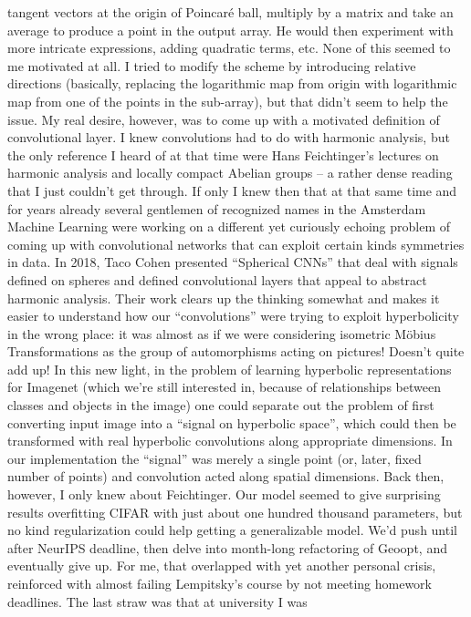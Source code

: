 tangent vectors at the origin of Poincar\'e ball, multiply by a matrix and take
an average to produce a point in the output array. He would then experiment
with more intricate expressions, adding quadratic terms, etc. None of this seemed
to me motivated at all. I tried to modify the scheme by introducing relative
directions (basically, replacing the logarithmic map from origin with
logarithmic map from one of the points in the sub-array), but that didn't seem
to help the issue. My real desire, however, was to come up with a motivated
definition of convolutional layer. I knew convolutions had to do with harmonic analysis,
but the only reference I heard of at that time were Hans Feichtinger's lectures
on harmonic analysis and locally compact Abelian groups -- a rather dense
reading that I just couldn't get through. If only I knew then that at that same
time and for years already several gentlemen of recognized names in the
Amsterdam Machine Learning were working on a different yet curiously echoing
problem of coming up with convolutional networks that can exploit certain kinds
symmetries in data. In 2018, Taco Cohen presented ``Spherical CNNs'' that deal
with signals defined on spheres and defined convolutional layers that appeal to
abstract harmonic analysis. Their work clears up the thinking somewhat and
makes it easier to understand how our ``convolutions'' were trying to exploit
hyperbolicity in the wrong place: it was almost as if we were considering
isometric M\"obius Transformations as the group of automorphisms acting on pictures!
Doesn't quite add up! In this new light, in the problem of learning hyperbolic
representations for Imagenet (which we're still interested in, because of
relationships between classes and objects in the image) one could separate out
the problem of first converting input image into a ``signal on hyperbolic
space'', which could then be transformed with real hyperbolic convolutions
along appropriate dimensions. In our implementation the ``signal'' was merely a
single point (or, later, fixed number of points) and convolution acted along
spatial dimensions.
Back then, however, I only knew about Feichtinger. Our model seemed to give
surprising results overfitting CIFAR with just about one hundred thousand
parameters, but no kind regularization could help getting a generalizable
model. We'd push until after NeurIPS deadline, then delve into month-long
refactoring of Geoopt, and eventually give up. For me, that overlapped with yet
another personal crisis, reinforced with almost failing Lempitsky's course by
not meeting homework deadlines. The last straw was that at university I was
